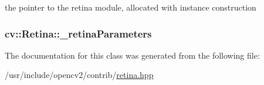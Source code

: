 the pointer to the retina module, allocated with instance construction 

\hypertarget{classcv_1_1Retina_a2ef9ec525730aadb05194240c764e672}{
\subsubsection[{\-\_\-retina\-Parameters}]{ cv\-::\-Retina\-::\-\_\-retina\-Parameters\hspace{0.3cm}{\ttfamily [protected]}}}\label{classcv_1_1Retina_a2ef9ec525730aadb05194240c764e672}


The documentation for this class was generated from the following file\-:\begin{DoxyCompactItemize}
\item 
/usr/include/opencv2/contrib/\hyperlink{retina_8hpp}{retina.\-hpp}\end{DoxyCompactItemize}
